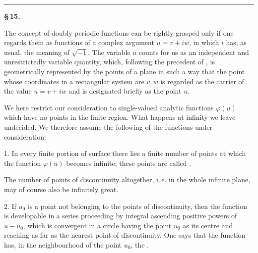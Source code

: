 
\begin{center}

\medskip
\textbf{}
\end{center}

\bigskip
\begin{center}\rule{2cm}{0.4pt}\end{center}
\bigskip

\begin{center}
\textbf{\S\,15. }
\end{center}

The concept of doubly periodic functions can be rightly grasped only if one regards them as functions of a complex argument $u = v + iw$, in which $i$ has, as usual, the meaning of $\sqrt{-1}$. The variable $u$ counts for us as an independent and unrestrictedly variable quantity, which, following the precedent of , is geometrically represented by the points of a plane in such a way that the point whose coordinates in a rectangular system are $v, w$ is regarded as the carrier of the value $u = v + iw$ and is designated briefly as the point $u$.

We here restrict our consideration to single-valued analytic functions $\varphi(u)$ which have no  points in the finite region. What happens at infinity we leave undecided. We therefore assume the following of the functions under consideration:

1. In every finite portion of surface there lies a finite number of points at which the function $\varphi(u)$ becomes infinite; these points are called .

The number of points of discontinuity altogether, i.\,e. in the whole infinite plane, may of course also be infinitely great.

2. If $u_0$ is a point not belonging to the points of discontinuity, then the function is developable in a series proceeding by integral ascending positive powers of $u - u_0$, which is convergent in a circle having the point $u_0$ as its centre and reaching as far as the nearest point of discontinuity. One says that the function has, in the neighbourhood of the point $u_0$, the .
